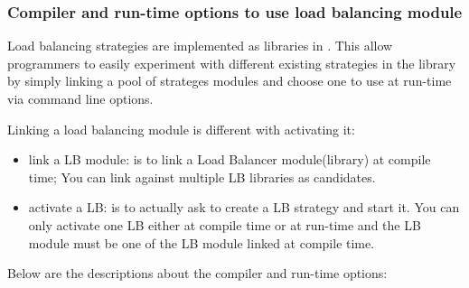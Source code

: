 \subsubsection{Compiler and run-time options to use load balancing module}
\label{lbOption}

Load balancing strategies are implemented as libraries in \charmpp{}. This
allow programmers to easily experiment with different existing strategies 
in the library by simply linking a pool of strateges modules and choose 
one to use at run-time via command line options.

Linking a load balancing module is different with activating it:
\begin{itemize}
\item link a LB module: is to link a Load Balancer module(library) at 
   compile time; You can link against multiple LB libraries as candidates.
\item activate a LB: is to actually ask to create a LB strategy and 
   start it. You can only activate one LB either at compile time or at
   run-time and the LB module must be one of the LB module linked at 
   compile time.
\end{itemize}


Below are the descriptions about the compiler and run-time options:

